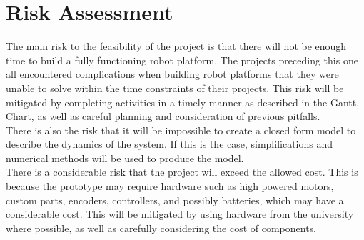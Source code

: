 \chapter{Risk Assessment}

The main risk to the feasibility of the project is that there will not be enough time to build a fully functioning robot platform. The projects preceding this one all encountered complications when building robot platforms that they were unable to solve within the time constraints of their projects. This risk will be mitigated by completing activities in a timely manner as described in the Gantt. Chart, as well as careful planning and consideration of previous pitfalls.
\\

\noindent There is also the risk that it will be impossible to create a closed form model to describe the dynamics of the system. If this is the case, simplifications and numerical methods will be used to produce the model.\\

\noindent There is a considerable risk that the project will exceed the allowed cost. This is because the prototype may require hardware such as high powered motors, custom parts, encoders, controllers, and possibly batteries, which may have a considerable cost. This will be mitigated by using hardware from the university where possible, as well as carefully considering the cost of components.\\


